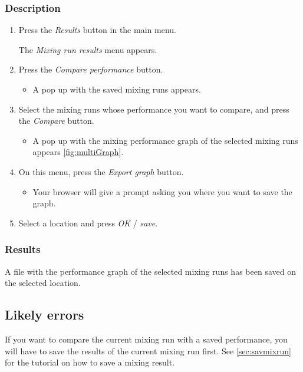 \subsubsection{Description}
\begin{enumerate}
	\item Press the \emph{Results} button in the main menu.
		\begin{itemize}
            The \emph{Mixing run results} menu appears. 
		\end{itemize}
	\item Press the \emph{Compare performance} button.
		\begin{itemize}
            \item A pop up with the saved mixing runs appears. 
		\end{itemize}
	\item Select the mixing runs whose performance you want to compare, and press the \emph{Compare} button.  
		\begin{itemize}
            \item A pop up with the mixing performance graph of the selected mixing runs appears \ref{fig:multiGraph}.
		\end{itemize}
	\item On this menu, press the \emph{Export graph} button. 
        \begin{itemize}
            \item Your browser will give a prompt asking you where you want to save the graph.
        \end{itemize}
	\item  Select a location and press \emph{OK} / \emph{save}.
\end{enumerate}


\subsubsection{Results}
A file with the performance graph of the selected mixing runs has been saved on the selected location.

\subsection{Likely errors}
If you want to compare the current mixing run with a saved performance, you will have to save the results of the current mixing run first. See \ref{sec:savmixrun} for the tutorial on how to save a mixing result.

